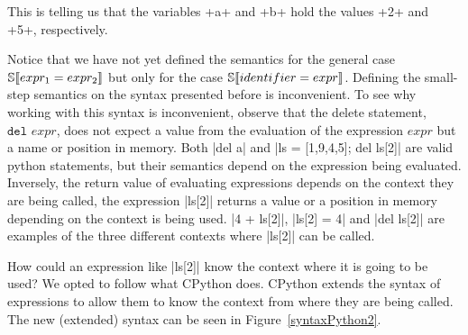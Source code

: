 This is telling us that the variables \pycode+a+ and \pycode+b+ hold the values
\pycode+2+ and \pycode+5+, respectively.

Notice that we have not yet defined the semantics for the general case
$\mathbb{S}\!\left\llbracket expr_1 = expr_2 \right\rrbracket$ but only for the case $\mathbb{S}\!\left\llbracket identifier = expr \right\rrbracket$.
Defining the small-step semantics on the syntax presented before is inconvenient. To see
why working with this syntax is inconvenient, observe that the delete statement,
$\texttt{del } expr$, does not expect a value from the evaluation of the expression
$expr$ but a name or position in memory.  Both \pycode|del a| and \pycode|ls = [1,9,4,5];
del ls[2]| are valid python statements, but their semantics depend on the
expression being evaluated. Inversely, the return value of evaluating expressions depends
on the context they are being called, the expression \pycode|ls[2]| returns a value or a
position in memory depending on the context is being used. \pycode|4 + ls[2]|,
\pycode|ls[2] = 4| and \pycode|del ls[2]| are examples of the three different contexts
where \pycode|ls[2]| can be called.

How could an expression like \pycode|ls[2]| know the context where it is going to be used?
We opted to follow what CPython does. CPython extends the syntax of expressions to allow
them to know the context from where they are being called. The new (extended) syntax can be
seen in Figure~\ref{syntaxPython2}.

